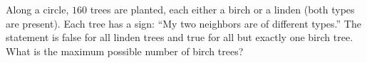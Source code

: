 Along a circle, $160$ trees are planted, each either a birch or a linden (both types are present). Each tree has a sign: ``My two neighbors are of different types.'' The statement is false for all linden trees and true for all but exactly one birch tree. What is the maximum possible number of birch trees?
